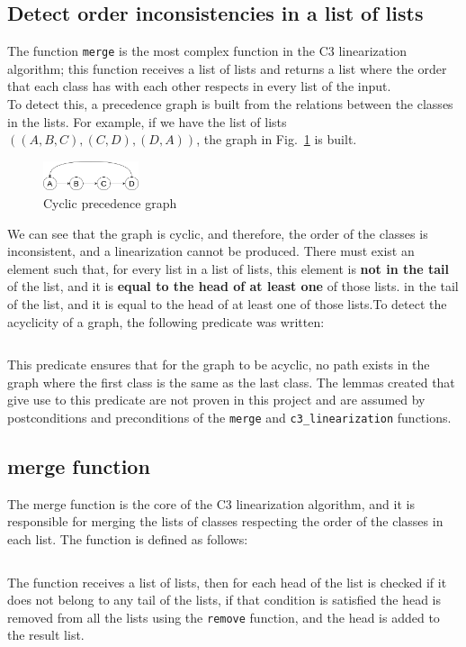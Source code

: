 \documentclass[runningheads]{llncs}
\begin{document}
\subsection{Detect order inconsistencies in a list of lists}
\label{sec:detectOrderInconsistencies}
The function \texttt{merge} is the most complex function in the C3 linearization algorithm; this function receives a list of lists and returns a list where the order that each class has with each other respects in every list of the input.\\
To detect this, a precedence graph is built from the relations between the classes in the lists. For example, if we have the list of lists $((A, B, C),(C, D),(D, A))$, the graph in Fig.~\ref{fig:cyclicGraph} is built.
\begin{figure}[htbp]
  \centering
  \includegraphics[width=0.25\textwidth]{images/cyclicGraph.png}
  \caption{Cyclic precedence graph}
  \label{fig:cyclicGraph}
\end{figure}
We can see that the graph is cyclic, and therefore, the order of the classes is inconsistent, and a linearization cannot be produced.
There must exist an element such that, for every list in a list of lists, this element is \textbf{not in the tail} of the list, and it is \textbf{equal to the head of at least one} of those lists.
in the tail of the list, and it is equal to the head of at least one of those lists.To detect the acyclicity of a graph, the following predicate was written:
\inputminted[firstline=64,lastline=80,fontsize=\small,linenos,xleftmargin=20pt]{ocaml}{../c3/cameleer/c3.ml}
This predicate ensures that for the graph to be acyclic, no path exists in the graph where the first class is the same as the last class.
The lemmas created that give use to this predicate are not proven in this project and are assumed by postconditions and preconditions of the \texttt{merge} and \texttt{c3\_linearization} functions.

\subsection{merge function}
The merge function is the core of the C3 linearization algorithm, and it is responsible for merging the lists of classes respecting the order of the classes in each list.
The function is defined as follows:
\inputminted[firstline=363,lastline=386,fontsize=\small,linenos,xleftmargin=20pt]{ocaml}{../c3/cameleer/c3.ml}
The function receives a list of lists, then for each head of the list is checked if it does not belong to any tail of the lists, 
if that condition is satisfied the head is removed from all the lists using the \texttt{remove} function, and the head is added to the result list.
\end{document}
